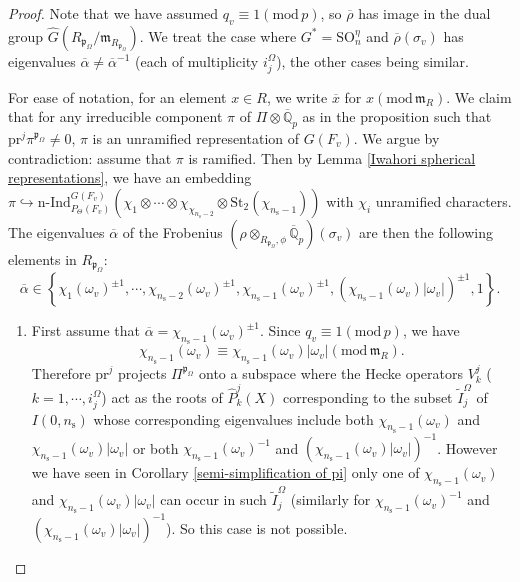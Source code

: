 \documentclass[12pt,oneside,reqno]{amsart}
\theoremstyle{plain}
\begin{document}
	\begin{proof}
		Note that we have assumed $q_v\equiv1(\mathrm{mod}\,p)$, so $\overline{\rho}$ has image in the dual group $\widehat{G}(R_{\mathfrak{p}_\Omega}/\mathfrak{m}_{R_{\mathfrak{p}_\Omega}})$.
		We treat the case where $G^\ast=\mathrm{SO}_n^\eta$ and
		$\overline{\rho}(\sigma_v)$
		has eigenvalues
		$\overline{\alpha}\ne\overline{\alpha}^{-1}$
		(each of multiplicity
		$i_j^\Omega$),
		the other cases being similar.
		
		
		
		
		For ease of notation, for an element $x \in R$, we write $\overline{x}$
		for $x(\mathrm{mod}\,\mathfrak{m}_R)$. We claim that for any irreducible component $\pi$ of $\Pi\otimes\overline{\mathbb{Q}}_p$ as in the proposition such that $\mathrm{pr}^j\pi^{\mathfrak{p}_\Omega}\ne0$,
		$\pi$ is an unramified representation of $ G(F_v)$.	We argue by contradiction: assume that $\pi$ is ramified. Then by Lemma
		\ref{Iwahori spherical representations}, we have an embedding
		$\pi\hookrightarrow\mathrm{n}\text{-}\mathrm{Ind}_{P_\Theta(F_v)}^{ G(F_v)}(\chi_1\otimes\cdots\otimes\chi_{\chi_{n_{\mathrm{s}}-2}}
		\otimes\mathrm{St}_2(\chi_{n_{\mathrm{s}}-1}))$ with $\chi_i$ unramified characters. The eigenvalues $\overline{\alpha}$ of the Frobenius
		$(\rho\otimes_{R_{\mathfrak{p}_\Omega},\phi}\overline{\mathbb{Q}}_p)(\sigma_v)$ are then the following elements in $R_{\mathfrak{p}_\Omega}$:
		\[
		\overline{\alpha}
		\in
		\left\{
		\chi_1(\omega_v)^{\pm1},\cdots,
		\chi_{n_{\mathrm{s}}-2}(\omega_v)^{\pm1},
		\chi_{n_{\mathrm{s}}-1}(\omega_v)^{\pm1},
		(\chi_{n_{\mathrm{s}}-1}(\omega_v)|\omega_v|)^{\pm1},1
		\right\}.
		\]
		\begin{enumerate}
			\item
			First assume that
			$\overline{\alpha}=\chi_{n_{\mathrm{s}}-1}(\omega_v)^{\pm1}$.
			Since
			$q_v\equiv1
			(\mathrm{mod}\,p)$,
			we have
			\[
			\chi_{n_{\mathrm{s}}-1}(\omega_v)
			\equiv
			\chi_{n_{\mathrm{s}}-1}(\omega_v)|\omega_v|
			(\mathrm{mod}\,\mathfrak{m}_R).
			\]
			Therefore
			$\mathrm{pr}^j$
			projects $\Pi^{\mathfrak{p}_\Omega}$
			onto a subspace where
			the Hecke operators
			$V_k^j$
			($k=1,\cdots,i_j^\Omega$)
			act as the roots of
			$\widehat{P}_k^j(X)$
			corresponding to the subset
			$\widetilde{I}_j^\Omega$
			of
			$I(0,n_\mathrm{s})$
			whose corresponding eigenvalues include
			both
			$\chi_{n_{\mathrm{s}}-1}(\omega_v)$ and
			$\chi_{n_{\mathrm{s}}-1}(\omega_v)|\omega_v|$
			or both
			$\chi_{n_{\mathrm{s}}-1}(\omega_v)^{-1}$ and
			$(\chi_{n_{\mathrm{s}}-1}(\omega_v)|\omega_v|)^{-1}$.
			However we have seen in
			Corollary \ref{semi-simplification of pi}
			only one of
			$\chi_{n_{\mathrm{s}}-1}(\omega_v)$
			and
			$\chi_{n_{\mathrm{s}}-1}(\omega_v)|\omega_v|$
			can occur in such
			$\widetilde{I}_j^\Omega$
			(similarly for
			$\chi_{n_{\mathrm{s}}-1}(\omega_v)^{-1}$ and
			$(\chi_{n_{\mathrm{s}}-1}(\omega_v)|\omega_v|)^{-1}$).
			So this case is not possible.
			

\end{enumerate}
\end{proof}
\end{document}
